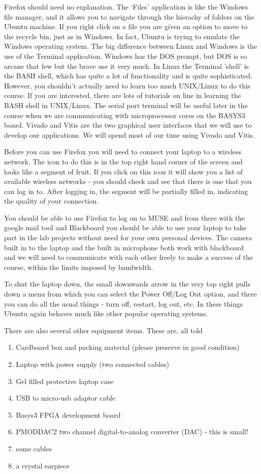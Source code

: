 \documentclass[../physical_computing.tex]{subfiles}
\begin{document}
Firefox should need no explanation. The `Files' application is like the Windows file manager, and it allows you to navigate through the hierachy of folders on the Ubuntu machine. If you right click on a file you are given an option to move to the recycle bin, just as in Windows. In fact, Ubuntu is trying to emulate the Windows operating system. The big difference between Linux and Windows is the use of the Terminal application. Windows has the DOS prompt, but DOS is so arcane that few but the brave use it very much. In Linux the Terminal 'shell' is the BASH shell, which has quite a lot of functionality and is quite sophisticated. However, you shouldn't actually need to learn too much UNIX/Linux to do this course. If you are interested, there are lots of tutorials on line in learning the BASH shell in UNIX/Linux. The serial port terminal will be useful later in the course when we are communicating with microprocessor cores on the BASYS3 board. Vivado and Vitis are the two graphical user interfaces that we will use to develop our applications. We will spend most of our time using Vivado and Vitis.

Before you can use Firefox you will need to connect your laptop to a wireless network. The icon to do this is in the top right hand corner of the screen and looks like a segment of fruit. If you click on this icon it will show you a list of available wireless networks - you should check and see that there is one that you can log in to. After logging in, the segment will be partially filled in, indicating the quality of your connection.

You should be able to use Firefox to log on to MUSE and from there with the google mail tool and Blackboard you should be able to use your laptop to take part in the lab projects without need for your own personal devices. The camera built in to the laptop and the built in microphone both work with blackboard and we will need to communicate with each other freely to make a success of the course, within the limits imposed by bandwidth.

To shut the laptop down, the small downwards arrow in the very top right pulls down a menu from which you can select the Power Off/Log Out option, and there you can do all the usual things - turn off, restart, log out, etc. In these things Ubuntu again behaves much like other popular operating systems.

There are also several other equipment items. These are, all told
\begin{enumerate}
    \item Cardboard box and packing material (please preserve in good condition)
    \item Laptop with power supply (two connected cables)
    \item Gel filled protective laptop case
    \item USB to micro-usb adaptor cable
    \item Basys3 FPGA development board
    \item PMODDAC2 two channel digital-to-analog converter (DAC) - this is small!
    \item some cables
    \item a crystal earpiece
\end{enumerate}
\end{document}
